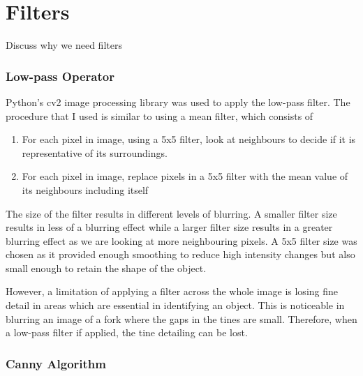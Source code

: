 \section{Filters}
Discuss why we need filters
\subsubsection{Low-pass Operator}

Python's cv2 image processing library was used to apply the low-pass filter. The procedure that I used is similar to using a mean filter, which consists of
\begin{enumerate}
	\item For each pixel in image, using a 5x5 filter, look at neighbours to decide if it is representative of its surroundings.
	\item For each pixel in image, replace pixels in a 5x5 filter with the mean value of its neighbours including itself
\end{enumerate}
The size of the filter results in different levels of blurring. A smaller filter size results in less of a blurring effect while a larger filter size results in a greater blurring effect as we are looking at more neighbouring pixels. A 5x5 filter size was chosen as it provided enough smoothing to reduce high intensity changes but also small enough to retain the shape of the object.

However, a limitation of applying a filter across the whole image is losing fine detail in areas which are essential in identifying an object. This is noticeable in blurring an image of a fork where the gaps in the tines are small. Therefore, when a low-pass filter if applied, the tine detailing can be lost.

\subsubsection{Canny Algorithm}

